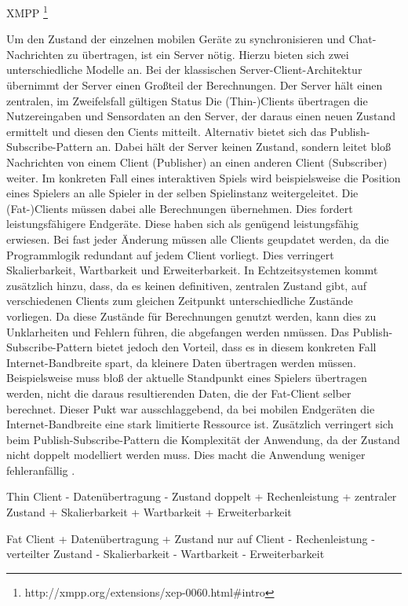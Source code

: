 XMPP \footnote{http://xmpp.org/extensions/xep-0060.html#intro}

Um den Zustand der einzelnen mobilen Geräte zu synchronisieren und Chat-Nachrichten zu übertragen, ist ein Server nötig.
Hierzu bieten sich zwei unterschiedliche Modelle an.
Bei der klassischen Server-Client-Architektur übernimmt der Server einen Großteil der Berechnungen.
Der Server hält einen zentralen, im Zweifelsfall gültigen Status
Die (Thin-)Clients übertragen die Nutzereingaben und Sensordaten an den Server, der daraus einen neuen Zustand ermittelt und diesen den Cients mitteilt.
Alternativ bietet sich das Publish-Subscribe-Pattern an. 
Dabei hält der Server keinen Zustand, sondern leitet bloß Nachrichten von einem Client (Publisher) an einen anderen Client (Subscriber) weiter.
Im konkreten Fall eines interaktiven Spiels wird beispielsweise die Position eines Spielers an alle Spieler in der selben Spielinstanz weitergeleitet.
Die (Fat-)Clients müssen dabei alle Berechnungen übernehmen. Dies fordert leistungsfähigere Endgeräte. Diese haben sich als genügend leistungsfähig erwiesen.
Bei fast jeder Änderung müssen alle Clients geupdatet werden, da die Programmlogik redundant auf jedem Client vorliegt. Dies verringert Skalierbarkeit, Wartbarkeit und Erweiterbarkeit. In Echtzeitsystemen kommt zusätzlich hinzu, dass, da es keinen definitiven, zentralen Zustand gibt, auf verschiedenen Clients zum gleichen Zeitpunkt unterschiedliche Zustände vorliegen. Da diese Zustände für Berechnungen genutzt werden, kann dies zu Unklarheiten und Fehlern führen, die abgefangen werden nmüssen.
Das Publish-Subscribe-Pattern bietet jedoch den Vorteil, dass es in diesem konkreten Fall Internet-Bandbreite spart, da kleinere Daten übertragen werden müssen. Beispielsweise muss bloß der aktuelle Standpunkt eines Spielers übertragen werden, nicht die daraus resultierenden Daten, die der Fat-Client selber berechnet.
Dieser Pukt war ausschlaggebend, da bei mobilen Endgeräten die Internet-Bandbreite eine stark limitierte Ressource ist.
Zusätzlich verringert sich beim Publish-Subscribe-Pattern die Komplexität der Anwendung, da der Zustand nicht doppelt modelliert werden muss. Dies macht die Anwendung weniger fehleranfällig \cite{xmpp, http://www.sigs.de/publications/js/2003/01/schaeffer_JS_01_03.pdf}.

Thin Client
- Datenübertragung
- Zustand doppelt
+ Rechenleistung
+ zentraler Zustand
+ Skalierbarkeit
+ Wartbarkeit
+ Erweiterbarkeit

Fat Client
+ Datenübertragung
+ Zustand nur auf Client
- Rechenleistung
- verteilter Zustand
- Skalierbarkeit
- Wartbarkeit
- Erweiterbarkeit

